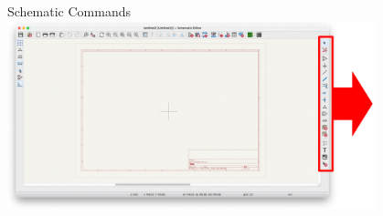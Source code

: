 \documentclass{beamer}
\begin{document}
\begin{frame}{Schematic Commands}
  \hspace{-0.5cm}\includegraphics[width=0.8\textwidth]{images/eeschema.png}
\end{frame}
\end{document}
